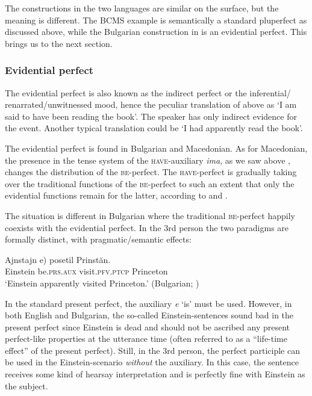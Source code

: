 \documentclass[output=paper,colorlinks,citecolor=brown]{langscibook}
\begin{document}
\noindent The constructions in the two languages are similar on the surface, but the meaning is different. The BCMS example  is semantically a standard pluperfect as discussed above, while the Bulgarian construction in   is an evidential perfect. This brings us to the  next section.


\subsubsection{Evidential perfect}

The evidential perfect is also known as the indirect perfect or the inferential/ renarrated/unwitnessed mood, hence the peculiar translation of  above as  `I am said to have been reading the book'. The speaker has only indirect evidence for the event. Another typical translation could be `I had apparently read the book'.

The evidential perfect is found in Bulgarian and Macedonian.  As for Macedonian,  the presence in the tense system of the \textsc{have}-auxiliary {\textit{ima}}, as we saw above , changes the distribution of the \textsc{be}-perfect. The \textsc{have}-perfect is gradually taking over the traditional
functions of the \textsc{be}-perfect to such an extent that only the evidential functions remain for the
latter, according to \citet{graves00} and \citet{lindstedt00}.

The situation is different in Bulgarian where the traditional \textsc{be}-perfect happily coexists with the evidential perfect. In the 3rd person  the two paradigms are formally distinct, with  pragmatic/semantic effects:

\ea\gll
Ajnstajn \minsp{(\#} e) posetil Prinstăn. \\
Einstein {} be.\textsc{prs}.\textsc{aux} visit.\textsc{pfv.}\textsc{ptcp} Princeton \\ \glt
`Einstein apparently visited Princeton.’ 
\hfill (Bulgarian; \cite[233]{Izvorski1997})
\z

\noindent In the standard present perfect, the auxiliary \textit{e} `is' must be used. However, in both English and Bulgarian, the so-called Einstein-sentences sound bad in the present perfect since Einstein is dead and should not be ascribed any present perfect-like properties at the utterance time (often referred to as a ``life-time effect'' of the present perfect). Still, in the 3rd person, the perfect participle can be used in the Einstein-scenario {\textit{without}} the auxiliary. In this case, the sentence receives some kind of hearsay interpretation and is perfectly fine with Einstein as the subject.
\end{document}
